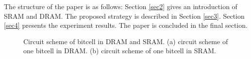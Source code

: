 \documentclass[lettersize,journal]{IEEEtran}
\begin{document}
The structure of the paper is as follows: Section \ref{sec2} gives an introduction of SRAM and DRAM. The proposed strategy is described in Section \ref{sec3}. Section \ref{sec4} presents the experiment results. The paper is concluded in the final section.
\begin{figure}[htb]
\centering
{}
\hfil
{}
\caption{Circuit scheme of bitcell in DRAM and SRAM. (a) circuit scheme of one bitcell in DRAM. (b) circuit scheme of one bitcell in SRAM.}
\label{fig2}
\end{figure}
\end{document}
